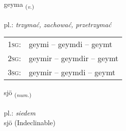 \documentclass[frontgrid, backgrid]{flacards}\usepackage[]{graphicx}\usepackage[]{xcolor}
\begin{document}
\renewcommand{\flhead}{\vskip5pt \fboxsep=0pt {\small\bfseries\footnotesize Sagnorð | Verb}}
\renewcommand{\fcfoot}{\vskip5pt \fboxsep=0pt \hspace{2pt}{\small\bfseries\footnotesize 1K}}

\renewcommand{\blhead}{\vskip5pt {\small\bfseries\footnotesize Sagnorð | Verb }}
\renewcommand{\bcfoot}{\vskip5pt \hspace{2pt}{\small\bfseries\footnotesize 1K}}


{geyma \small{\textsubscript{(\textit{v.})}} \\[1ex] %
\textphonetic{[ceiːma]} \\
pl.: \emph{trzymać, zachować, przetrzymać} \\  [2ex]
\renewcommand*{\arraystretch}{0.8}
\begin{tabular}{p{1cm}l}
\textsc{1sg}: & geymi -- geymdi -- geymt \\ 
\textsc{2sg}: & geymir -- geymdir -- geymt \\ 
\textsc{3sg}: & geymir -- geymdi -- geymt \\ 
\end{tabular}
}


\renewcommand{\flhead}{\vskip5pt \fboxsep=0pt {\small\bfseries\footnotesize Töluorð | Numeral}}
\renewcommand{\fcfoot}{\vskip5pt \fboxsep=0pt \hspace{2pt}{\small\bfseries\footnotesize 1K}}

\renewcommand{\blhead}{\vskip5pt {\small\bfseries\footnotesize Töluorð | Numeral }}
\renewcommand{\bcfoot}{\vskip5pt \hspace{2pt}{\small\bfseries\footnotesize 1K}}


{sjö \small{\textsubscript{(\textit{num.})}} \\[1ex]
\textphonetic{[sjœː]} \\
pl.: \emph{siedem} \\  [2ex]
sjö (Indeclinable)}
\end{document}
